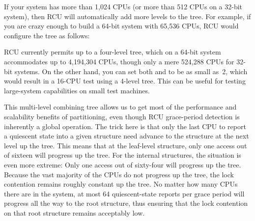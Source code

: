 If your system has more than 1,024 CPUs (or more than 512 CPUs on a
32-bit system), then RCU will automatically add more levels to the tree.
For example, if you are crazy enough to build a 64-bit system with
65,536 CPUs, RCU would configure the  tree as follows:

\begin{center}
\end{center}

RCU currently permits up to a four-level tree, which on a 64-bit system
accommodates up to 4,194,304 CPUs, though only a mere 524,288 CPUs for
32-bit systems.
On the other hand, you can set both
 and  to be as small as~2,
which would result in a 16-CPU test using a 4-level tree.
This can be
useful for testing large-system capabilities on small test machines.

This multi-level combining tree allows us to get most of the performance
and scalability benefits of partitioning, even though RCU grace-period
detection is inherently a global operation.
The trick here is that only
the last CPU to report a quiescent state into a given 
structure need advance to the  structure at the next level
up the tree.
This means that at the leaf-level  structure,
only one access out of sixteen will progress up the tree.
For the
internal  structures, the situation is even more extreme:
Only one access out of sixty-four will progress up the tree.
Because the
vast majority of the CPUs do not progress up the tree, the lock
contention remains roughly constant up the tree.
No matter how many CPUs
there are in the system, at most 64 quiescent-state reports per grace
period will progress all the way to the root  structure,
thus ensuring that the lock contention on that root 
structure remains acceptably low.

